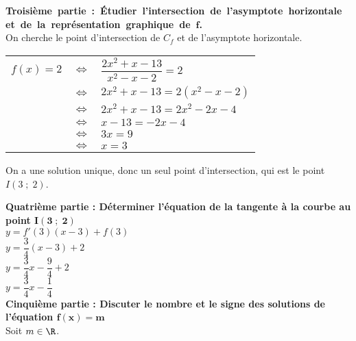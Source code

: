 \vspace*{.3cm}

\textbf{\hbox{Troisième partie : Étudier l'intersection de l'asymptote horizontale et de la représentation graphique de $\mathbf{f}$.}} \\

On cherche le point d'intersection de $C_f$ et de l'asymptote horizontale. \\

\begin{tabular}{lll}
$f(x) = 2$ & $\Longleftrightarrow$ & $\dfrac{2x^2 + x - 13}{x^2 - x - 2} = 2$ \vspace*{.3cm} \\
& $\Longleftrightarrow$ & $2x^2 + x - 13 = 2\left(x^2 - x - 2\right)$ \vspace*{.3cm} \\
&$\Longleftrightarrow$ & $2x^2 + x - 13 = 2x^2 - 2x - 4$ \vspace*{.3cm} \\
&$\Longleftrightarrow$ & $x - 13 = -2x - 4$ \vspace*{.3cm} \\
&$\Longleftrightarrow$ & $3x = 9$ \vspace*{.3cm} \\
&$\Longleftrightarrow$ & $x = 3$ \vspace*{.3cm} \\
\end{tabular}

On a une solution unique, donc un seul point d'intersection, qui est le point $I(3 \; ; \; 2)$.

\newpage

\textbf{Quatrième partie : Déterminer l'équation de la tangente à la courbe au point $\mathbf{I(3 \; ; \; 2)}$} \\

$y = f'(3)(x-3) + f(3)$ \\

$y = \dfrac{3}{4}(x - 3) + 2$ \\

$y = \dfrac{3}{4}x - \dfrac{9}{4} + 2$ \\

$ y = \dfrac{3}{4}x - \dfrac{1}{4}$ \\

\textbf{Cinquième partie : Discuter le nombre et le signe des solutions de l'équation $\mathbf{f(x) = m}$} \\

Soit $m \in \R$. \\

